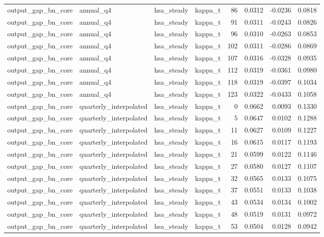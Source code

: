 \begin{tabular}{llllrrrr}
output\_gap\_bn\_core & annual\_q4 & hsa\_steady & kappa\_t & 86 & 0.0312 & -0.0236 & 0.0818 \\
output\_gap\_bn\_core & annual\_q4 & hsa\_steady & kappa\_t & 91 & 0.0311 & -0.0243 & 0.0826 \\
output\_gap\_bn\_core & annual\_q4 & hsa\_steady & kappa\_t & 96 & 0.0310 & -0.0263 & 0.0853 \\
output\_gap\_bn\_core & annual\_q4 & hsa\_steady & kappa\_t & 102 & 0.0311 & -0.0286 & 0.0869 \\
output\_gap\_bn\_core & annual\_q4 & hsa\_steady & kappa\_t & 107 & 0.0316 & -0.0328 & 0.0935 \\
output\_gap\_bn\_core & annual\_q4 & hsa\_steady & kappa\_t & 112 & 0.0319 & -0.0361 & 0.0980 \\
output\_gap\_bn\_core & annual\_q4 & hsa\_steady & kappa\_t & 118 & 0.0319 & -0.0397 & 0.1034 \\
output\_gap\_bn\_core & annual\_q4 & hsa\_steady & kappa\_t & 123 & 0.0322 & -0.0433 & 0.1058 \\
output\_gap\_bn\_core & quarterly\_interpolated & hsa\_steady & kappa\_t & 0 & 0.0662 & 0.0093 & 0.1330 \\
output\_gap\_bn\_core & quarterly\_interpolated & hsa\_steady & kappa\_t & 5 & 0.0647 & 0.0102 & 0.1288 \\
output\_gap\_bn\_core & quarterly\_interpolated & hsa\_steady & kappa\_t & 11 & 0.0627 & 0.0109 & 0.1227 \\
output\_gap\_bn\_core & quarterly\_interpolated & hsa\_steady & kappa\_t & 16 & 0.0615 & 0.0117 & 0.1193 \\
output\_gap\_bn\_core & quarterly\_interpolated & hsa\_steady & kappa\_t & 21 & 0.0599 & 0.0122 & 0.1146 \\
output\_gap\_bn\_core & quarterly\_interpolated & hsa\_steady & kappa\_t & 27 & 0.0580 & 0.0127 & 0.1107 \\
output\_gap\_bn\_core & quarterly\_interpolated & hsa\_steady & kappa\_t & 32 & 0.0565 & 0.0133 & 0.1075 \\
output\_gap\_bn\_core & quarterly\_interpolated & hsa\_steady & kappa\_t & 37 & 0.0551 & 0.0133 & 0.1038 \\
output\_gap\_bn\_core & quarterly\_interpolated & hsa\_steady & kappa\_t & 43 & 0.0534 & 0.0134 & 0.1002 \\
output\_gap\_bn\_core & quarterly\_interpolated & hsa\_steady & kappa\_t & 48 & 0.0519 & 0.0131 & 0.0972 \\
output\_gap\_bn\_core & quarterly\_interpolated & hsa\_steady & kappa\_t & 53 & 0.0504 & 0.0128 & 0.0942 \\

\end{tabular}
